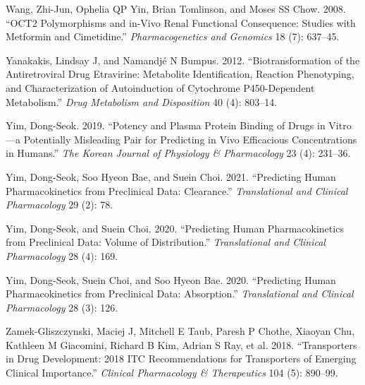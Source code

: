 \documentclass[
  11pt,
  krantz2, a4paper, twoside]{krantz}
\newlength{\cslhangindent}
\newlength{\cslentryspacingunit} %
\newenvironment{CSLReferences}[2] %
 {%
  \setlength{\parindent}{0pt}
  \ifodd #1
  \let\oldpar\par
  \def\par{\hangindent=\cslhangindent\oldpar}
  \fi
  \setlength{\parskip}{#2\cslentryspacingunit}
 }%
 {}
\begin{document}
\begin{CSLReferences}{1}{0}
\leavevmode{}%
Wang, Zhi-Jun, Ophelia QP Yin, Brian Tomlinson, and Moses SS Chow. 2008. {``OCT2 Polymorphisms and in-Vivo Renal Functional Consequence: Studies with Metformin and Cimetidine.''} \emph{Pharmacogenetics and Genomics} 18 (7): 637--45.

\leavevmode{}%
Yanakakis, Lindsay J, and Namandjé N Bumpus. 2012. {``Biotransformation of the Antiretroviral Drug Etravirine: Metabolite Identification, Reaction Phenotyping, and Characterization of Autoinduction of Cytochrome P450-Dependent Metabolism.''} \emph{Drug Metabolism and Disposition} 40 (4): 803--14.

\leavevmode{}%
Yim, Dong-Seok. 2019. {``Potency and Plasma Protein Binding of Drugs in Vitro---a Potentially Misleading Pair for Predicting in Vivo Efficacious Concentrations in Humans.''} \emph{The Korean Journal of Physiology \& Pharmacology} 23 (4): 231--36.

\leavevmode{}%
Yim, Dong-Seok, Soo Hyeon Bae, and Suein Choi. 2021. {``Predicting Human Pharmacokinetics from Preclinical Data: Clearance.''} \emph{Translational and Clinical Pharmacology} 29 (2): 78.

\leavevmode{}%
Yim, Dong-Seok, and Suein Choi. 2020. {``Predicting Human Pharmacokinetics from Preclinical Data: Volume of Distribution.''} \emph{Translational and Clinical Pharmacology} 28 (4): 169.

\leavevmode{}%
Yim, Dong-Seok, Suein Choi, and Soo Hyeon Bae. 2020. {``Predicting Human Pharmacokinetics from Preclinical Data: Absorption.''} \emph{Translational and Clinical Pharmacology} 28 (3): 126.

\leavevmode{}%
Zamek-Gliszczynski, Maciej J, Mitchell E Taub, Paresh P Chothe, Xiaoyan Chu, Kathleen M Giacomini, Richard B Kim, Adrian S Ray, et al. 2018. {``Transporters in Drug Development: 2018 ITC Recommendations for Transporters of Emerging Clinical Importance.''} \emph{Clinical Pharmacology \& Therapeutics} 104 (5): 890--99.

\end{CSLReferences}

\printindex
\end{document}
